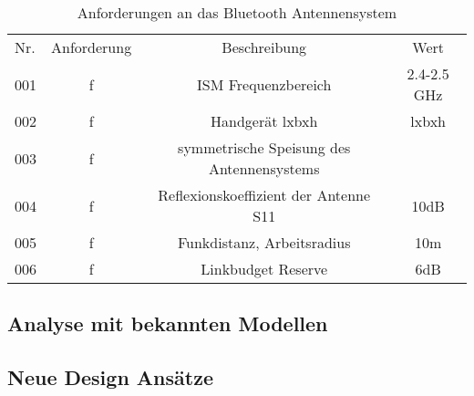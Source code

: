 \begin{table}[htb]
 \centering
\begin{tabular}{lccc}\toprule 
Nr. & Anforderung & Beschreibung & Wert   \\ 
001 & f & ISM Frequenzbereich  & 2.4-2.5 GHz  \\ 
002 & f & Handgerät lxbxh & lxbxh    \\  
003 & f & symmetrische Speisung des Antennensystems   \\  
004 & f & Reflexionskoeffizient der Antenne S11 & 10dB  \\ 
005 & f & Funkdistanz, Arbeitsradius & 10m   \\ 
006 & f & Linkbudget Reserve & 6dB   \\ \bottomrule
  \end{tabular}
  \caption{Anforderungen an das Bluetooth Antennensystem}
  \label{AnforderungenAntenneSystem}
\end{table} 

\subsection{Analyse mit bekannten Modellen}
\subsection{Neue Design Ansätze}